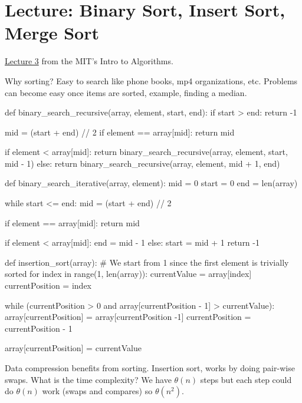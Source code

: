 \chapter{Lecture: Binary Sort, Insert Sort, Merge Sort}
\href{https://ocw.mit.edu/courses/electrical-engineering-and-computer-science/6-006-introduction-to-algorithms-fall-2011/lecture-videos/lecture-3-insertion-sort-merge-sort/}{Lecture 3} from the MIT's 
Intro to Algorithms.

Why sorting? Easy to search like phone books, mp4 organizations, etc. Problems can become easy
once items are sorted, example, finding a median.
\begin{python}
def binary_search_recursive(array, element, start, end):
    if start > end:
        return -1

    mid = (start + end) // 2
    if element == array[mid]:
        return mid

    if element < array[mid]:
        return binary_search_recursive(array, element, start, mid - 1)
    else:
        return binary_search_recursive(array, element, mid + 1, end)
        
def binary_search_iterative(array, element):
    mid = 0
    start = 0
    end = len(array)

    while start <= end:
        mid = (start + end) // 2

        if element == array[mid]:
            return mid

        if element < array[mid]:
            end = mid - 1
        else:
            start = mid + 1
    return -1
    
def insertion_sort(array):
    # We start from 1 since the first element is trivially sorted
    for index in range(1, len(array)):
        currentValue = array[index]
        currentPosition = index

        while (currentPosition > 0 and 
            array[currentPosition - 1] > currentValue):
            array[currentPosition] = array[currentPosition -1]
            currentPosition = currentPosition - 1

        array[currentPosition] = currentValue
\end{python}
Data compression benefits from sorting. Insertion sort, works by doing pair-wise swaps. What is the time
complexity? We have \(\theta(n)\) steps but each step could do \(\theta(n)\) work (swaps and compares)
 so \(\theta(n^2)\). 
 
